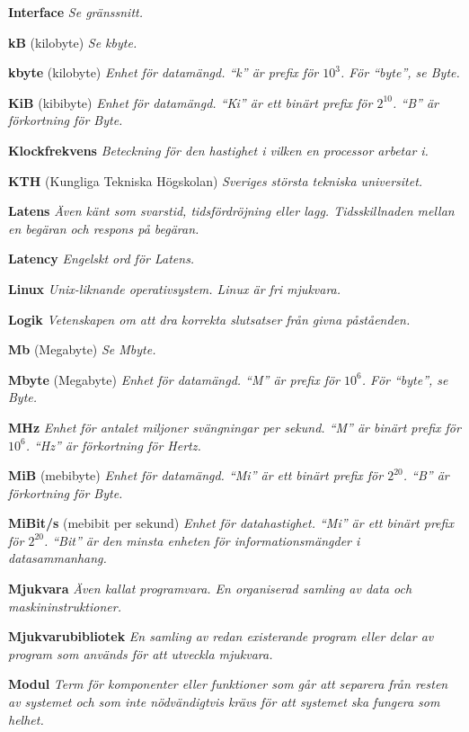 \documentclass[a4paper, twoside, 11pt, titlepage]{article}
\begin{document}
	\textbf{Interface} \emph{Se gränssnitt.}

	\textbf{kB} (kilobyte) \emph{Se kbyte.}

	\textbf{kbyte} (kilobyte) \emph{Enhet för datamängd. ``k'' är prefix för $10^{3}$. För ``byte'', se Byte.}

	\textbf{KiB} (kibibyte) \emph{Enhet för datamängd. ``Ki'' är ett binärt prefix för $2^{10}$. ``B'' är förkortning för Byte.}

	\textbf{Klockfrekvens} \emph{Beteckning för den hastighet i vilken en processor arbetar i.}

	\textbf{KTH} (Kungliga Tekniska Högskolan) \emph{Sveriges största tekniska universitet.}

	\textbf{Latens} \emph{Även känt som svarstid, tidsfördröjning eller lagg. Tidsskillnaden mellan en begäran och respons på begäran.}

	\textbf{Latency} \emph{Engelskt ord för Latens.}

	\textbf{Linux} \emph{Unix-liknande operativsystem. Linux är fri mjukvara.}

	\textbf{Logik} \emph{Vetenskapen om att dra korrekta slutsatser från givna påståenden.}

	\textbf{Mb} (Megabyte) \emph{Se Mbyte.}

	\textbf{Mbyte} (Megabyte) \emph{Enhet för datamängd. ``M'' är prefix för $10^{6}$.  För ``byte'', se Byte.}

	\textbf{MHz} \emph{Enhet för antalet miljoner svängningar per sekund. ``M'' är binärt prefix för $10^{6}$. ``Hz'' är förkortning för Hertz.}

	\textbf{MiB} (mebibyte) \emph{Enhet för datamängd. ``Mi'' är ett binärt prefix för $2^{20}$. ``B'' är förkortning för Byte.}

	\textbf{MiBit/s} (mebibit per sekund) \emph{Enhet för datahastighet. ``Mi'' är ett binärt prefix för $2^{20}$. ``Bit'' är den minsta enheten för informationsmängder i datasammanhang.}

	\textbf{Mjukvara} \emph{Även kallat programvara. En organiserad samling av data och maskininstruktioner.}

	\textbf{Mjukvarubibliotek} \emph{En samling av redan existerande program eller delar av program som används för att utveckla mjukvara.}

	\textbf{Modul} \emph{Term för komponenter eller funktioner som går att separera från resten av systemet och som inte nödvändigtvis krävs för att systemet ska fungera som helhet.}
\end{document}
